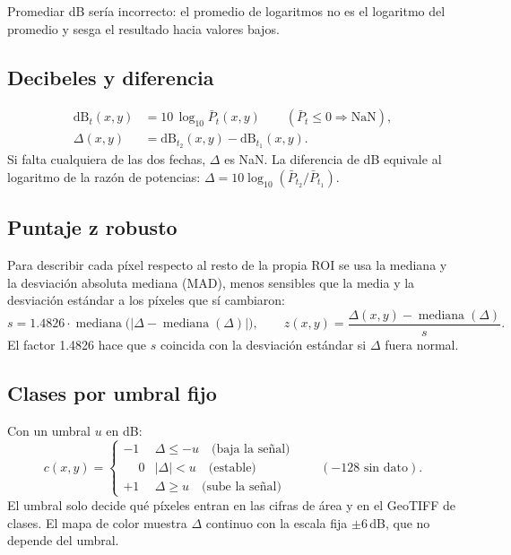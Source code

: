 \documentclass[11pt,a4paper]{article}
\begin{document}
Promediar dB sería incorrecto: el promedio de logaritmos no es el logaritmo del promedio y sesga el
resultado hacia valores bajos.

\subsection{Decibeles y diferencia}

\begin{align}
  \text{dB}_t(x,y) &= 10\,\log_{10} \bar{P}_t(x,y) \qquad (\bar{P}_t \le 0 \Rightarrow \text{NaN}),\\
  \Delta(x,y) &= \text{dB}_{t_2}(x,y) - \text{dB}_{t_1}(x,y).
  \label{eq:delta}
\end{align}
Si falta cualquiera de las dos fechas, $\Delta$ es NaN. La diferencia de dB equivale al logaritmo
de la razón de potencias: $\Delta = 10\log_{10}(\bar{P}_{t_2}/\bar{P}_{t_1})$.

\subsection{Puntaje z robusto}

Para describir cada píxel respecto al resto de la propia ROI se usa la mediana y la desviación
absoluta mediana (MAD), menos sensibles que la media y la desviación estándar a los píxeles que sí
cambiaron:
\begin{equation}
  s = 1.4826\cdot \operatorname{mediana}\bigl(|\Delta - \operatorname{mediana}(\Delta)|\bigr),
  \qquad
  z(x,y) = \frac{\Delta(x,y) - \operatorname{mediana}(\Delta)}{s}.
  \label{eq:z}
\end{equation}
El factor 1.4826 hace que $s$ coincida con la desviación estándar si $\Delta$ fuera normal.

\subsection{Clases por umbral fijo}

Con un umbral $u$ en dB:
\begin{equation}
  c(x,y) =
  \begin{cases}
    -1 & \Delta \le -u \quad\text{(baja la señal)}\\
    \phantom{-}0 & |\Delta| < u \quad\text{(estable)}\\
    +1 & \Delta \ge u \quad\text{(sube la señal)}
  \end{cases}
  \qquad (-128 \text{ sin dato}).
\end{equation}
El umbral solo decide qué píxeles entran en las cifras de área y en el GeoTIFF de clases. El mapa
de color muestra $\Delta$ continuo con la escala fija $\pm 6$\,dB, que no depende del umbral.
\end{document}
